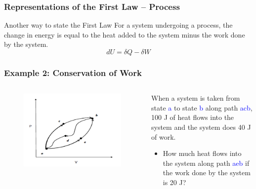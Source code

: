\documentclass[10pt,compress,handout,ignorenonframetext]{beamer}
\begin{document}
\begin{frame}
 \frametitle{Representations of the First Law -- Process}
 \begin{block}{Another way to state the First Law} 
  For a system undergoing a process, the change in energy is equal to the heat added to the system minus the work done by the system.
  \begin{displaymath}
   dU =\delta Q - \delta W 
  \end{displaymath}
 \end{block}
\end{frame}


\begin{frame}
 \frametitle{Example 2: Conservation of Work}
 \scriptsize
 \begin{columns}
  \begin{column}[r]{0.5\linewidth}
   \begin{figure}%
    \begin{center}
     \includegraphics[width=\columnwidth,clip]{./Pics/First_Law_1}
    \end{center}
   \end{figure}
  \end{column}
  \begin{column}[r]{0.5\linewidth}
   When a system is taken from state \textcolor{blue}{a} to state \textcolor{blue}{b} along path \textcolor{blue}{acb}, 100 J of heat flows into the system and the system does 40 J of work. 
   \begin{itemize}
    \item<2-> How much heat flows into the system along path \textcolor{blue}{aeb} if the work done by the system is 20 J?\\

\end{itemize}
\end{column}
\end{columns}
\end{frame}
\end{document}
